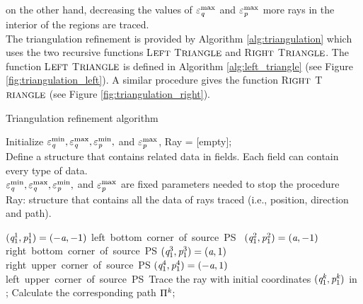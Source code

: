 on the other hand, decreasing the values of $\varepsilon_{\textit{q}}^\textrm{max}$ and $\varepsilon_{\textit{p}}^\textrm{max}$ more rays in the interior of the regions are traced. \\ \indent The triangulation refinement is provided by Algorithm \ref{alg:triangulation} which uses the two recursive functions L$\footnotesize{\textrm{EFT}}$ T$\footnotesize{\textrm{RIANGLE}}$ and  R$\footnotesize{\textrm{IGHT}}$ T$\footnotesize{\textrm{RIANGLE}}$.
The function L$\footnotesize{\textrm{EFT}}$ T$\footnotesize{\textrm{RIANGLE}}$ is defined in Algorithm \ref{alg:left_triangle} (see Figure \ref{fig:triangulation_left}). 
A similar procedure gives the function R$\footnotesize{\textrm{IGHT}}$ T$\footnotesize{\textrm{RIANGLE}}$ (see Figure \ref{fig:triangulation_right}).
\begin{algorithm}[h]
\caption{Triangulation refinement algorithm}\label{alg:triangulation}
Initialize $\varepsilon_{\textit{q}}^{\textrm{min}}, \varepsilon_{\textit{q}}^{\textrm{max}}, \varepsilon_{\textit{p}}^{\textrm{min}},$ and
 $\varepsilon_{\textit{p}}^{\textrm{max}}$, Ray = [empty];\\
Define a structure that contains related data in fields. Each field can contain every type of data. \\
\Comment $\varepsilon_{\textit{q}}^{\textrm{min}}, \varepsilon_{\textit{q}}^{\textrm{max}}, \varepsilon_{\textit{p}}^{\textrm{min}},$ and
 $\varepsilon_{\textit{p}}^{\textrm{max}}$ are fixed parameters needed to stop the procedure\\
\Comment Ray: structure that contains all the data of rays traced (i.e., position, direction and path).
\begin{algorithmic}[1]
\State $(\textit{q}_1^1, \textit{p}_1^1)= (-\textit{a}, -1)$ \Comment \mbox{left bottom corner of source PS \;}
\State $(\textit{q}_1^2, \textit{p}_1^2) = (\textit{a}, -1)$ \Comment \mbox{right bottom corner of source PS}
\State $(\textit{q}_1^3, \textit{p}_1^3)  = (\textit{a}, 1)$ \Comment \mbox{right upper corner of source PS\;\;}
\State $(\textit{q}_1^4, \textit{p}_1^4) = (-\textit{a}, 1) $ \Comment \mbox{left upper corner of source PS\;\;\;\;\,}
\State Trace the ray with initial coordinates $(\textit{q}_1^{\textit{k}}, \textit{p}_1^{\textit{k}})$ in ;
\State Calculate the corresponding path $\Pi^{\textit{k}}$; $\qquad \qquad \qquad \qquad \qquad \qquad \qquad \qquad\quad$

\end{algorithmic}
\end{algorithm}
